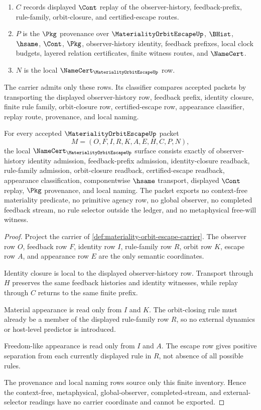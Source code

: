 \begin{definition}
\begin{enumerate}
\item $C$ records displayed $\Cont$ replay of the observer-history, feedback-prefix, rule-family, orbit-closure, and certified-escape routes.
\item $P$ is the $\Pkg$ provenance over $\MaterialityOrbitEscapeUp$, $\BHist$, $\hsame$, $\Cont$, $\Pkg$, observer-history identity, feedback prefixes, local clock budgets, layered relation certificates, finite witness routes, and $\NameCert$.
\item $N$ is the local $\NameCert_{\MaterialityOrbitEscapeUp}$ row.
\end{enumerate}
The carrier admits only these rows. Its classifier compares accepted packets by transporting the displayed observer-history row, feedback prefix, identity closure, finite rule family, orbit-closure row, certified-escape row, appearance classifier, replay route, provenance, and local naming.
\end{definition}

\begin{theorem}
\label{thm:materiality-orbit-escape-namecert-obligations}
For every accepted $\MaterialityOrbitEscapeUp$ packet
$$
M=(O,F,I,R,K,A,E,H,C,P,N),
$$
the local $\NameCert_{\MaterialityOrbitEscapeUp}$ surface consists exactly of observer-history identity admission, feedback-prefix admission, identity-closure readback, rule-family admission, orbit-closure readback, certified-escape readback, appearance classification, componentwise $\hsame$ transport, displayed $\Cont$ replay, $\Pkg$ provenance, and local naming. The packet exports no context-free materiality predicate, no primitive agency row, no global observer, no completed feedback stream, no rule selector outside the ledger, and no metaphysical free-will witness.
\end{theorem}
\begin{proof}
Project the carrier of \autoref{def:materiality-orbit-escape-carrier}. The observer row $O$, feedback row $F$, identity row $I$, rule-family row $R$, orbit row $K$, escape row $A$, and appearance row $E$ are the only semantic coordinates.

Identity closure is local to the displayed observer-history row. Transport through $H$ preserves the same feedback histories and identity witnesses, while replay through $C$ returns to the same finite prefix.

Material appearance is read only from $I$ and $K$. The orbit-closing rule must already be a member of the displayed rule-family row $R$, so no external dynamics or host-level predictor is introduced.

Freedom-like appearance is read only from $I$ and $A$. The escape row gives positive separation from each currently displayed rule in $R$, not absence of all possible rules.

The provenance and local naming rows source only this finite inventory. Hence the context-free, metaphysical, global-observer, completed-stream, and external-selector readings have no carrier coordinate and cannot be exported.
\end{proof}

